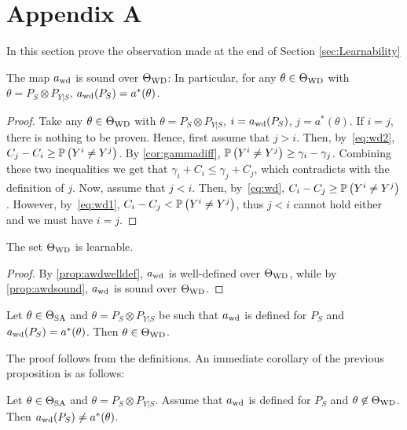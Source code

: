 
\section*{Appendix A}
In this section prove the observation made at the end of Section \ref{sec:Learnability}
\begin{prop}
	\label{prop:awdsound}
	The map $a_{\mathrm{wd}}$ is sound over $\Theta_{\mathrm{WD}}$: In particular, for any
	$\theta\in \Theta_{\mathrm{WD}}$ with $\theta = P_S\otimes P_{Y|S}$, $a_{\mathrm{wd}}(P_S)= a^*(\theta)$.
\end{prop}
\begin{proof}
	Take any $\theta\in \Theta_{\mathrm{WD}}$ with $\theta = P_S\otimes P_{Y|S}$, $i = a_{\mathrm{wd}}(P_S)$, $j = a^*(\theta)$.
	If $i=j$, there is nothing to be proven. Hence, first assume that $j>i$. Then, by~\eqref{eq:wd2}, $C_j - C_i \ge \mathbb{P}\left(Y^i \ne Y^j\right)$.
	By \cref{cor:gammadiff}, $\mathbb{P}\left(Y^i \ne Y^j \right) \ge \gamma_i - \gamma_j$. Combining these two inequalities we get that
	$\gamma_i + C_i \le \gamma_j + C_j$, which contradicts with the definition of $j$.
	Now, assume that $j<i$. Then, by~\eqref{eq:wd}, $C_i - C_j \ge \mathbb{P}\left(Y^i \ne Y^j\right)$.
	However, by~\eqref{eq:wd1}, $C_i -C_j < \mathbb{P}\left(Y^i \ne Y^j\right)$, thus $j<i$ cannot hold either and we must have $i=j$.
	\end{proof}

\begin{cor}\label{cor:twdlearnable}
	The set $\Theta_{\mathrm{WD}}$ is learnable.
\end{cor}
\begin{proof}
	By \cref{prop:awdwelldef}, $a_{\mathrm{wd}}$ is well-defined over $\Theta_{\mathrm{WD}}$, while by \cref{prop:awdsound}, $a_{\mathrm{wd}}$ is sound over $\Theta_{\mathrm{WD}}$.
\end{proof}


\begin{prop}
	\label{prop:awdcorrectimplieswd}
	Let $\theta \in \Theta_{\mathrm{SA}}$ and $\theta = P_S\otimes P_{Y|S}$ be such that $a_{\mathrm{wd}}$ is defined for $P_S$
	and $a_{\mathrm{wd}}(P_S) = a^*(\theta)$. Then $\theta \in \Theta_{\mathrm{WD}}$.
\end{prop}
The proof follows from the definitions. An immediate corollary of the previous proposition is as follows:
\begin{cor}\label{cor:awdoutsideincorrect}
	Let $\theta \in \Theta_{\mathrm{SA}}$ and $\theta = P_S \otimes P_{Y|S}$. 
	Assume that $a_{\mathrm{wd}}$ is defined for $P_S$ and $\theta \not\in \Theta_{\mathrm{WD}}$. Then $a_{\mathrm{wd}}(P_S) \ne a^*(\theta)$.
\end{cor}

